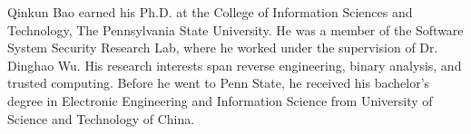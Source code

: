 
Qinkun Bao earned his Ph.D. at the College of Information Sciences
and Technology, The Pennsylvania State University. He was a member of the Software 
System Security Research Lab, where he worked under the supervision of Dr. Dinghao Wu.
His research interests span reverse engineering, binary analysis, and trusted computing. Before he went to Penn State, he received his bachelor's degree in Electronic Engineering and Information Science from University of Science and Technology of China.


 